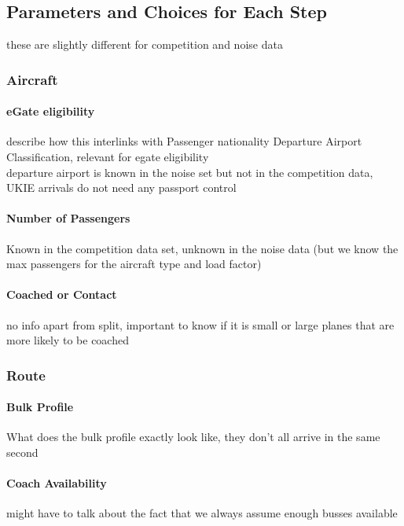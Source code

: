 \documentclass[10pt]{article}
\begin{document}
\subsection{Parameters and Choices for Each Step}
these are slightly different for competition and noise data

\subsubsection{Aircraft}

\paragraph{eGate eligibility}
describe how this interlinks with Passenger nationality Departure Airport Classification, relevant for \gls{egate} eligibility \\
 departure airport is known in the noise set but not in the competition data, UKIE arrivals do not need any passport control

\paragraph{Number of Passengers}
Known in the competition data set, unknown in the noise data (but we know the max passengers for the aircraft type and load factor)

\paragraph{Coached or Contact}
no info apart from split, important to know if it is small or large planes that are more likely to be coached

\subsubsection{Route}

\paragraph{Bulk Profile} 
What does the bulk profile exactly look like, they don't all arrive in the same second 

\paragraph{Coach Availability}
might have to talk about the fact that we always assume enough busses available
\end{document}
